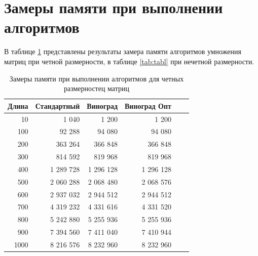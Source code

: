 \clearpage

\section{Замеры памяти при выполнении алгоритмов}

В таблице \ref{tab:table} представлены результаты замера памяти алгоритмов умножения
матриц при четной размерности, в таблице \ref{tab:tabl} при нечетной размерности.

\begin{table}[!ht]
    \centering
    \caption{\label{tab:table}Замеры памяти при выполнении алгоритмов для четных размерностец матриц}
    \begin{tabular}{|r|r|r|r|r|r|}
    \hline
        Длина & Стандартный & Виноград & Виноград Опт   \\ \hline
        10 & 1 040 & 1 200 & 1 200   \\ \hline
        100 & 92 288 & 94 080 & 94 080   \\ \hline
        200 & 363 264 & 366 848 & 366 848   \\ \hline
        300 & 814 592 & 819 968 & 819 968   \\ \hline
        400 & 1 289 728 & 1 296 128 & 1 296 128   \\ \hline
        500 & 2 060 288 & 2 068 480 & 2 068 576   \\ \hline
        600 & 2 937 032 & 2 944 512 & 2 944 512   \\ \hline
        700 & 4 319 232 & 4 331 616 & 4 331 520   \\ \hline
        800 & 5 242 880 & 5 255 936 & 5 255 936   \\ \hline
        900 & 7 394 560 & 7 411 040 & 7 410 944   \\ \hline
        1000 & 8 216 576 & 8 232 960 & 8 232 960  \\ \hline
    \end{tabular}
\end{table}

